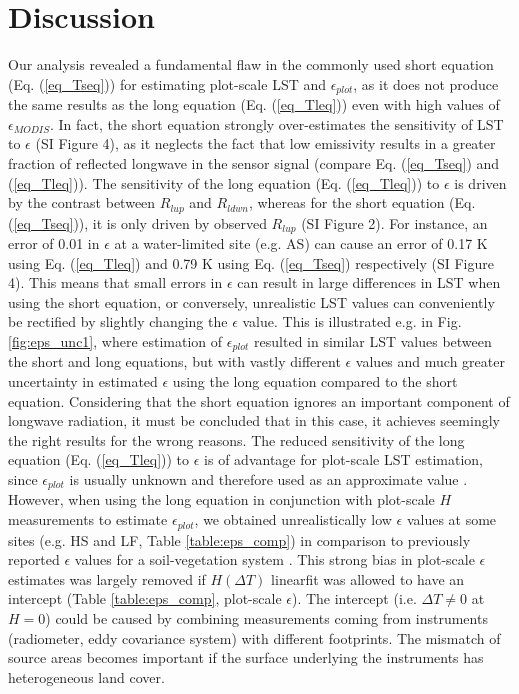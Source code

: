 \documentclass[fleqn,10pt]{wlscirep}
\begin{document}
\section{Discussion}
Our analysis revealed a fundamental flaw in the commonly used short equation (Eq. (\ref{eq_Tseq})) for estimating plot-scale LST and $\epsilon_{plot}$, as it does not produce the same results as the long equation (Eq. (\ref{eq_Tleq})) even with high values of $\epsilon_{MODIS}$. In fact, the short equation strongly over-estimates the sensitivity of LST to $\epsilon$ (SI Figure 4), as it neglects the fact that low emissivity results in a greater fraction of reflected longwave in the sensor signal (compare Eq. (\ref{eq_Tseq}) and (\ref{eq_Tleq})). The sensitivity of the long equation (Eq. (\ref{eq_Tleq})) to $\epsilon$ is driven by the contrast between $R_{lup}$ and $R_{ldwn}$, whereas for the short equation (Eq. (\ref{eq_Tseq})), it is only driven by observed $R_{lup}$ (SI Figure 2). For instance, an error of 0.01 in $\epsilon$ at a water-limited site (e.g. AS) can cause an error of 0.17 K using Eq. (\ref{eq_Tleq}) and 0.79 K using Eq. (\ref{eq_Tseq}) respectively (SI Figure 4). This means that small errors in $\epsilon$ can result in large differences in LST when using the short equation, or conversely, unrealistic LST values can conveniently be rectified by slightly changing the $\epsilon$ value. This is illustrated e.g. in Fig. \ref{fig:eps_unc1}, where estimation of $\epsilon_{plot}$ resulted in similar LST values between the short and long equations, but with vastly different $\epsilon$ values and much greater uncertainty in estimated $\epsilon$ using the long equation compared to the short equation. Considering that the short equation ignores an important component of longwave radiation, it must be concluded that in this case, it achieves seemingly the right results for the wrong reasons. The reduced sensitivity of the long equation (Eq. (\ref{eq_Tleq})) to $\epsilon$ is of advantage for plot-scale LST estimation, since $\epsilon_{plot}$ is usually unknown and therefore used as an approximate value \cite{mallick2018bridging}. However, when using the long equation in conjunction with plot-scale $H$ measurements to estimate $\epsilon_{plot}$, we obtained unrealistically low $\epsilon$ values at some sites (e.g. HS and LF, Table \ref{table:eps_comp}) in comparison to previously reported $\epsilon$ values for a soil-vegetation system \cite{sugita1996optimal,snyder1998classification}. This strong bias in plot-scale $\epsilon$ estimates was largely removed if  $H(\Delta T)$ linearfit was allowed to have an intercept (Table \ref{table:eps_comp}, plot-scale $\epsilon$). The intercept (i.e. $\Delta T \ne 0$ at $H=0$) could be caused by combining measurements coming from instruments (radiometer, eddy covariance system) with different footprints\cite{marcolla2018geometry}. The mismatch of source areas becomes important if the surface underlying the instruments has heterogeneous land cover. 
\end{document}
